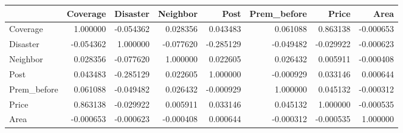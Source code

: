 \begin{tabular}{lrrrrrrr}
\toprule
 & Coverage & Disaster & Neighbor & Post & Prem\_before & Price & Area \\
\midrule
Coverage & 1.000000 & -0.054362 & 0.028356 & 0.043483 & 0.061088 & 0.863138 & -0.000653 \\
Disaster & -0.054362 & 1.000000 & -0.077620 & -0.285129 & -0.049482 & -0.029922 & -0.000623 \\
Neighbor & 0.028356 & -0.077620 & 1.000000 & 0.022605 & 0.026432 & 0.005911 & -0.000408 \\
Post & 0.043483 & -0.285129 & 0.022605 & 1.000000 & -0.000929 & 0.033146 & 0.000644 \\
Prem\_before & 0.061088 & -0.049482 & 0.026432 & -0.000929 & 1.000000 & 0.045132 & -0.000312 \\
Price & 0.863138 & -0.029922 & 0.005911 & 0.033146 & 0.045132 & 1.000000 & -0.000535 \\
Area & -0.000653 & -0.000623 & -0.000408 & 0.000644 & -0.000312 & -0.000535 & 1.000000 \\
\bottomrule
\end{tabular}

